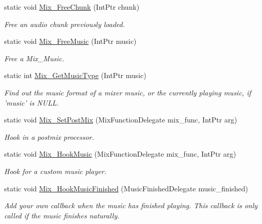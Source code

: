 \begin{DoxyCompactItemize}
static void \hyperlink{namespace_tao_1_1_sdl_acb89d8e0973042e20753f347932f23a7}{Mix\_\-FreeChunk} (IntPtr chunk)
\begin{DoxyCompactList}\small\item\em Free an audio chunk previously loaded. \item\end{DoxyCompactList}\item 
static void \hyperlink{namespace_tao_1_1_sdl_a0afcccc309e6b24b697083403acddef6}{Mix\_\-FreeMusic} (IntPtr music)
\begin{DoxyCompactList}\small\item\em Free a Mix\_\-Music. \item\end{DoxyCompactList}\item 
static int \hyperlink{namespace_tao_1_1_sdl_a0957a6b61a81f557f92c694f97684eac}{Mix\_\-GetMusicType} (IntPtr music)
\begin{DoxyCompactList}\small\item\em Find out the music format of a mixer music, or the currently playing music, if 'music' is NULL. \item\end{DoxyCompactList}\item 
static void \hyperlink{namespace_tao_1_1_sdl_a7b8112ec561db2dcc794323f798a7851}{Mix\_\-SetPostMix} (MixFunctionDelegate mix\_\-func, IntPtr arg)
\begin{DoxyCompactList}\small\item\em Hook in a postmix processor. \item\end{DoxyCompactList}\item 
static void \hyperlink{namespace_tao_1_1_sdl_a3ceda7fbd60c8eeed0719440d19d935e}{Mix\_\-HookMusic} (MixFunctionDelegate mix\_\-func, IntPtr arg)
\begin{DoxyCompactList}\small\item\em Hook for a custom music player. \item\end{DoxyCompactList}\item 
static void \hyperlink{namespace_tao_1_1_sdl_adacfc77044e70b36c6be7b0b74f96b29}{Mix\_\-HookMusicFinished} (MusicFinishedDelegate music\_\-finished)
\begin{DoxyCompactList}\small\item\em Add your own callback when the music has finished playing. This callback is only called if the music finishes naturally. \item\end{DoxyCompactList}\item 

\end{DoxyCompactItemize}
